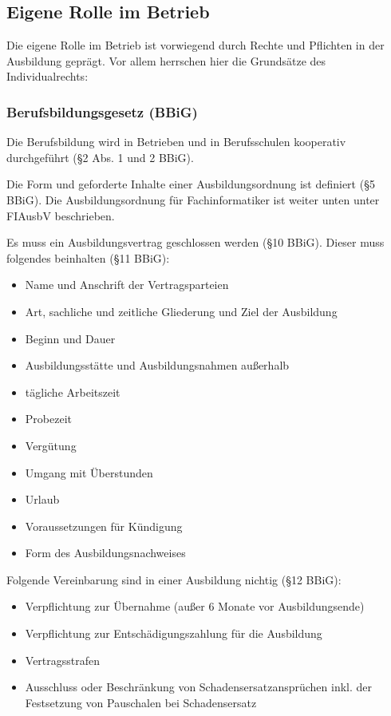 \subsection{Eigene Rolle im Betrieb}

Die eigene Rolle im Betrieb ist vorwiegend durch Rechte und Pflichten in der Ausbildung geprägt. Vor allem herrschen hier die Grundsätze des Individualrechts:

\subsubsection{Berufsbildungsgesetz (BBiG)}

Die Berufsbildung wird in Betrieben und in Berufsschulen kooperativ durchgeführt (§2 Abs. 1 und 2 BBiG).

Die Form und geforderte Inhalte einer Ausbildungsordnung ist definiert (§5 BBiG). Die Ausbildungsordnung für Fachinformatiker ist weiter unten unter FIAusbV beschrieben.

Es muss ein Ausbildungsvertrag geschlossen werden (§10 BBiG). Dieser muss folgendes beinhalten (§11 BBiG):

\begin{itemize}
    \item Name und Anschrift der Vertragsparteien
    \item Art, sachliche und zeitliche Gliederung und Ziel der Ausbildung
    \item Beginn und Dauer
    \item Ausbildungsstätte und Ausbildungsnahmen außerhalb
    \item tägliche Arbeitszeit
    \item Probezeit
    \item Vergütung
    \item Umgang mit Überstunden
    \item Urlaub
    \item Voraussetzungen für Kündigung
    \item Form des Ausbildungsnachweises
\end{itemize}

Folgende Vereinbarung sind in einer Ausbildung nichtig (§12 BBiG):

\begin{itemize}
    \item Verpflichtung zur Übernahme (außer 6 Monate vor Ausbildungsende)
    \item Verpflichtung zur Entschädigungszahlung für die Ausbildung
    \item Vertragsstrafen
    \item Ausschluss oder Beschränkung von Schadensersatzansprüchen inkl. der Festsetzung von Pauschalen bei Schadensersatz
\end{itemize}

